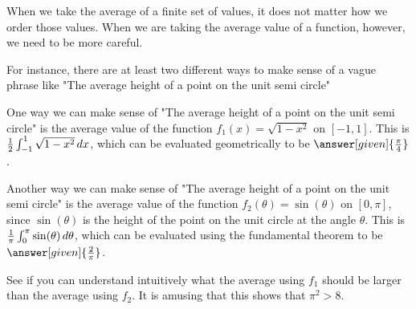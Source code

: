 \documentclass{ximera}
\begin{document}
\begin{question}
	When we take the average of a finite set of values, it does not matter how we order those values.  When we are taking the average value of a function, however, we need to be more careful.

For instance, there are at least two different ways to make sense of a vague phrase like "The average height of a point on the unit semi circle"

\begin{image}
\end{image}

One way we can make sense of "The average height of a point on the unit semi circle" is the average value of the function $f_1(x) = \sqrt{1-x^2}$ on $[-1,1]$.  This is $\frac{1}{2}\int_{-1}^1 \sqrt{1-x^2} \,d x$, which can be evaluated geometrically to be $\answer[given]{\frac{\pi}{4}}$.

Another way we can make sense of "The average height of a point on the unit semi circle" is the average value of the function $f_2(\theta) = \sin(\theta)$ on $[0,\pi]$, since $\sin(\theta)$ is the height of the point on the unit circle at the angle $\theta$.  This is $\frac{1}{\pi} \int_0^\pi \sin(\theta) \,d \theta$, which can be evaluated using the fundamental theorem to be $\answer[given]{\frac{2}{\pi}}$.

See if you can understand intuitively what the average using $f_1$ should be larger than the average using $f_2$.  It is amusing that this shows that $\pi^2>8$.

\end{question}
\end{document}
